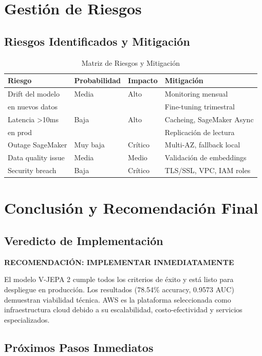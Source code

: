 \documentclass[11pt,letterpaper]{article}
\begin{document}
\section{Gestión de Riesgos}

\subsection{Riesgos Identificados y Mitigación}

\begin{table}[H]
\centering
\caption{Matriz de Riesgos y Mitigación}
\begin{tabular}{|l|l|l|l|}
\hline
\textbf{Riesgo} & \textbf{Probabilidad} & \textbf{Impacto} & \textbf{Mitigación} \\
\hline
Drift del modelo & Media & Alto & Monitoring mensual \\
en nuevos datos & & & Fine-tuning trimestral \\
\hline
Latencia >10ms & Baja & Alto & Cacheing, SageMaker Async \\
en prod & & & Replicación de lectura \\
\hline
Outage SageMaker & Muy baja & Crítico & Multi-AZ, fallback local \\
\hline
Data quality issue & Media & Medio & Validación de embeddings \\
\hline
Security breach & Baja & Crítico & TLS/SSL, VPC, IAM roles \\
\hline
\end{tabular}
\end{table}

\section{Conclusión y Recomendación Final}

\subsection{Veredicto de Implementación}

\textbf{RECOMENDACIÓN: IMPLEMENTAR INMEDIATAMENTE}

El modelo V-JEPA 2 cumple todos los criterios de éxito y está listo para despliegue en producción. Los resultados (78.54\% accuracy, 0.9573 AUC) demuestran viabilidad técnica. AWS es la plataforma seleccionada como infraestructura cloud debido a su escalabilidad, costo-efectividad y servicios especializados.

\subsection{Próximos Pasos Inmediatos}
\end{document}
